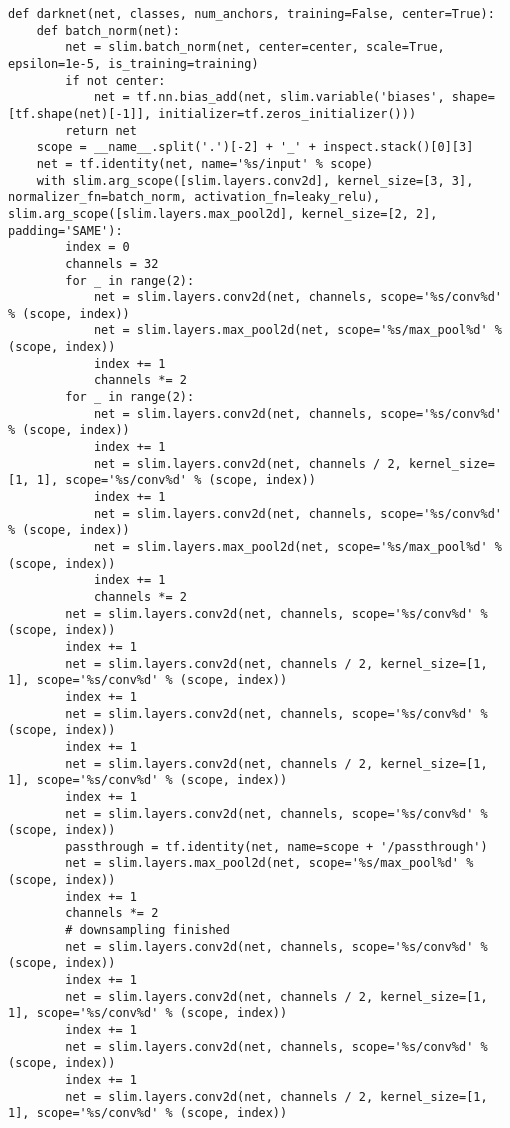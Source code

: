 \begin{lstlisting}
def darknet(net, classes, num_anchors, training=False, center=True):
    def batch_norm(net):
        net = slim.batch_norm(net, center=center, scale=True, epsilon=1e-5, is_training=training)
        if not center:
            net = tf.nn.bias_add(net, slim.variable('biases', shape=[tf.shape(net)[-1]], initializer=tf.zeros_initializer()))
        return net
    scope = __name__.split('.')[-2] + '_' + inspect.stack()[0][3]
    net = tf.identity(net, name='%s/input' % scope)
    with slim.arg_scope([slim.layers.conv2d], kernel_size=[3, 3], normalizer_fn=batch_norm, activation_fn=leaky_relu), slim.arg_scope([slim.layers.max_pool2d], kernel_size=[2, 2], padding='SAME'):
        index = 0
        channels = 32
        for _ in range(2):
            net = slim.layers.conv2d(net, channels, scope='%s/conv%d' % (scope, index))
            net = slim.layers.max_pool2d(net, scope='%s/max_pool%d' % (scope, index))
            index += 1
            channels *= 2
        for _ in range(2):
            net = slim.layers.conv2d(net, channels, scope='%s/conv%d' % (scope, index))
            index += 1
            net = slim.layers.conv2d(net, channels / 2, kernel_size=[1, 1], scope='%s/conv%d' % (scope, index))
            index += 1
            net = slim.layers.conv2d(net, channels, scope='%s/conv%d' % (scope, index))
            net = slim.layers.max_pool2d(net, scope='%s/max_pool%d' % (scope, index))
            index += 1
            channels *= 2
        net = slim.layers.conv2d(net, channels, scope='%s/conv%d' % (scope, index))
        index += 1
        net = slim.layers.conv2d(net, channels / 2, kernel_size=[1, 1], scope='%s/conv%d' % (scope, index))
        index += 1
        net = slim.layers.conv2d(net, channels, scope='%s/conv%d' % (scope, index))
        index += 1
        net = slim.layers.conv2d(net, channels / 2, kernel_size=[1, 1], scope='%s/conv%d' % (scope, index))
        index += 1
        net = slim.layers.conv2d(net, channels, scope='%s/conv%d' % (scope, index))
        passthrough = tf.identity(net, name=scope + '/passthrough')
        net = slim.layers.max_pool2d(net, scope='%s/max_pool%d' % (scope, index))
        index += 1
        channels *= 2
        # downsampling finished
        net = slim.layers.conv2d(net, channels, scope='%s/conv%d' % (scope, index))
        index += 1
        net = slim.layers.conv2d(net, channels / 2, kernel_size=[1, 1], scope='%s/conv%d' % (scope, index))
        index += 1
        net = slim.layers.conv2d(net, channels, scope='%s/conv%d' % (scope, index))
        index += 1
        net = slim.layers.conv2d(net, channels / 2, kernel_size=[1, 1], scope='%s/conv%d' % (scope, index))

\end{lstlisting}
